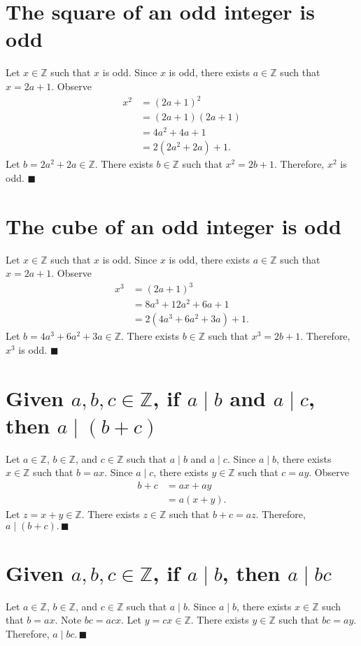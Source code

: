 \documentclass[12pt]{article}
\begin{document}
\section{The square of an odd integer is odd}
Let $x\in\mathbb{Z}$ such that $x$ is odd. Since $x$ is odd, there exists $a\in\mathbb{Z}$ such that $x=2a+1$. Observe
\begin{align*}
x^2
&=(2a+1)^2\\
&=(2a+1)(2a+1)\\
&=4a^2+4a+1\\
&=2(2a^2+2a)+1.
\end{align*}
Let $b=2a^2+2a\in\mathbb{Z}$. There exists $b\in\mathbb{Z}$ such that $x^2=2b+1$. Therefore, $x^2$ is odd. $\blacksquare$
\section{The cube of an odd integer is odd}
Let $x\in\mathbb{Z}$ such that $x$ is odd. Since $x$ is odd, there exists $a\in\mathbb{Z}$ such that $x=2a+1$. Observe
\begin{align*}
x^3
&=(2a+1)^3\\
&=8a^3+12a^2+6a+1\\
&=2(4a^3+6a^2+3a)+1.
\end{align*}
Let $b=4a^3+6a^2+3a\in\mathbb{Z}$. There exists $b\in\mathbb{Z}$ such that $x^3=2b+1$. Therefore, $x^3$ is odd. $\blacksquare$
\section{Given $a,b,c\in\mathbb{Z}$, if $a \mid b$ and $a \mid c$, then $a \mid (b+c)$}
Let $a\in\mathbb{Z}$, $b\in\mathbb{Z}$, and $c\in\mathbb{Z}$ such that $a \mid b$ and $a \mid c$. Since $a \mid b$, there exists $x\in\mathbb{Z}$ such that $b=ax$. Since $a \mid c$, there exists $y\in\mathbb{Z}$ such that $c=ay$. Observe
\begin{align*}
b+c
&=ax+ay\\
&=a(x+y).
\end{align*}
Let $z=x+y\in\mathbb{Z}$. There exists $z\in\mathbb{Z}$ such that $b+c=az$. Therefore, $a \mid (b+c).\,\blacksquare$
\section{Given $a,b,c\in\mathbb{Z}$, if $a \mid b$, then $a \mid bc$}
Let $a\in\mathbb{Z}$, $b\in\mathbb{Z}$, and $c\in\mathbb{Z}$ such that $a \mid b$. Since $a \mid b$, there exists $x\in\mathbb{Z}$ such that $b=ax$. Note $bc=acx$. Let $y=cx\in\mathbb{Z}$. There exists $y\in\mathbb{Z}$ such that $bc=ay$. Therefore, $a \mid bc.\,\blacksquare$
\end{document}
